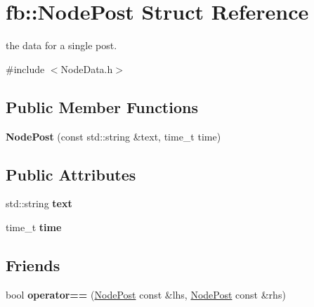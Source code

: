 \hypertarget{structfb_1_1_node_post}{\section{fb\+:\+:Node\+Post Struct Reference}
\label{structfb_1_1_node_post}
}


the data for a single post.  




{\ttfamily \#include $<$Node\+Data.\+h$>$}

\subsection*{Public Member Functions}
\begin{DoxyCompactItemize}
\item 
\hypertarget{structfb_1_1_node_post_ac8c487c9ace4e1eccd9fc98200cdd61c}{{\bfseries Node\+Post} (const std\+::string \&text, time\+\_\+t time)}\label{structfb_1_1_node_post_ac8c487c9ace4e1eccd9fc98200cdd61c}

\end{DoxyCompactItemize}
\subsection*{Public Attributes}
\begin{DoxyCompactItemize}
\item 
\hypertarget{structfb_1_1_node_post_a4fc27a03e1f2cb36e0599481a187f976}{std\+::string {\bfseries text}}\label{structfb_1_1_node_post_a4fc27a03e1f2cb36e0599481a187f976}

\item 
\hypertarget{structfb_1_1_node_post_a7f38ab1d67f652cef4bbf911428d992f}{time\+\_\+t {\bfseries time}}\label{structfb_1_1_node_post_a7f38ab1d67f652cef4bbf911428d992f}

\end{DoxyCompactItemize}
\subsection*{Friends}
\begin{DoxyCompactItemize}
\item 
\hypertarget{structfb_1_1_node_post_a94b30eb9f6afc44cc238917dd503df7f}{bool {\bfseries operator==} (\hyperlink{structfb_1_1_node_post}{Node\+Post} const \&lhs, \hyperlink{structfb_1_1_node_post}{Node\+Post} const \&rhs)}\label{structfb_1_1_node_post_a94b30eb9f6afc44cc238917dd503df7f}

\end{DoxyCompactItemize}


